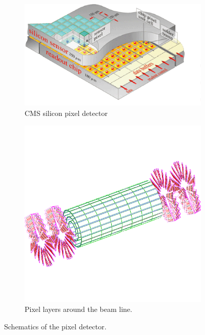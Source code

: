\documentclass[british,11pt,a4paper]{memoir}
\begin{document}
\begin{figure}[ht]
	\centering
	\begin{subfigure}[b]{0.47\textwidth}
        \includegraphics[width=\textwidth]{pixelement}
		\caption{\ac{CMS} silicon pixel detector}
		\label{p21}
	\end{subfigure}
	\hfill
	\begin{subfigure}[b]{0.47\textwidth}
		\includegraphics[width=\textwidth]{barrel}
		\caption{Pixel layers around the beam line.}
		\label{p22}
	\end{subfigure}
	\caption{Schematics of the pixel detector.}
	\label{ppixdet}
\end{figure}
\end{document}
